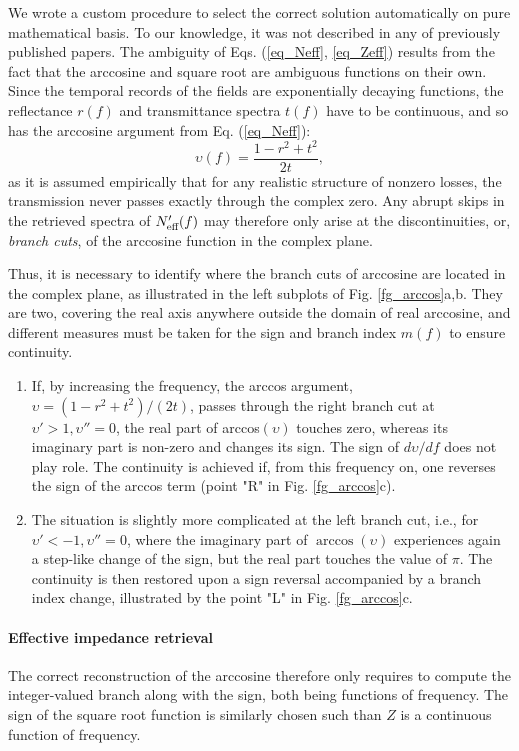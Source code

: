We wrote a custom procedure to select the correct solution automatically on pure mathematical basis. To our knowledge, it was not described in any of previously published papers.
The ambiguity of Eqs. (\ref{eq_Neff}, \ref{eq_Zeff}) results from the fact that the arccosine and square root are ambiguous functions \cite{simovski2009material} on their own. Since the temporal records of the fields are exponentially decaying functions, the reflectance  $r(f)$ and transmittance spectra $t(f)$ have to be continuous, and so has the arccosine argument from Eq. (\ref{eq_Neff}):
\begin{equation} \upsilon(f) = \frac{1-r^2+t^2}{2t},   \label{eq_upsilon}\end{equation}
as it is assumed empirically that for any realistic structure of nonzero losses, the transmission never passes exactly through the complex zero. Any abrupt skips in the retrieved spectra of $N_{\text{eff} }'(f)$ may therefore only arise at the discontinuities, or, \textit{branch cuts}, of the arccosine function in the complex plane.

Thus, it is necessary to identify where the branch cuts of arccosine are located in the complex plane, as illustrated in the left subplots of Fig. \ref{fg_arccos}a,b. They are two, covering the real axis anywhere outside the domain of real arccosine, and different measures must be taken for the sign and branch index $m(f)$ to ensure continuity.
\begin{enumerate}
\item{
		If, by increasing the frequency, the arccos argument, $\upsilon = (1 - r^2+t^2)/(2 t)$, passes through the right branch cut at $\upsilon' > 1, \upsilon'' = 0$, the real part of arccos$(\upsilon)$ touches zero, whereas its imaginary part is non-zero and changes its sign. The sign of $d\upsilon/df$ does not play role. The continuity is achieved if, from this frequency on, one reverses the sign of the arccos term (point "R" in Fig. \ref{fg_arccos}c). 
} 
\item{
	The situation is slightly more complicated at the left branch cut, i.e., for $\upsilon' < -1, \upsilon''=0$, where the imaginary part of $\arccos(\upsilon)$ experiences again a step-like change of the sign, but the real part touches the value of $\pi$. The continuity is then restored upon a sign reversal accompanied by a branch index change, illustrated by the point "L" in Fig. \ref{fg_arccos}c. 
} 
 \end{enumerate}
\paragraph{Effective impedance retrieval}
The correct reconstruction of the arccosine therefore only requires to compute the integer-valued branch along with the sign, both being functions of frequency. The sign of the square root function is similarly chosen such than $Z$ is a continuous function of frequency.  
